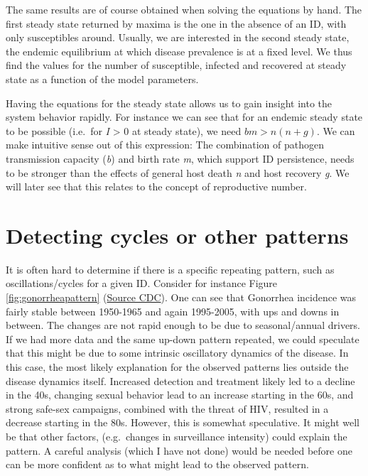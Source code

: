 \documentclass[
]{book}
\begin{document}
The same results are of course obtained when solving the equations by hand. The first steady state returned by maxima is the one in the absence of an ID, with only susceptibles around. Usually, we are interested in the second steady state, the endemic equilibrium at which disease prevalence is at a fixed level. We thus find the values for the number of susceptible, infected and recovered at steady state as a function of the model parameters.

Having the equations for the steady state allows us to gain insight into the system behavior rapidly. For instance we can see that for an endemic steady state to be possible (i.e.~for \emph{I} \textgreater{} 0 at steady state), we need \(b m > n (n+ g)\). We can make intuitive sense out of this expression: The combination of pathogen transmission capacity (\emph{b}) and birth rate \emph{m}, which support ID persistence, needs to be stronger than the effects of general host death \emph{n} and host recovery \emph{g}. We will later see that this relates to the concept of reproductive number.

\hypertarget{detecting-cycles-or-other-patterns}{%
\section{Detecting cycles or other patterns}\label{detecting-cycles-or-other-patterns}}

It is often hard to determine if there is a specific repeating pattern, such as oscillations/cycles for a given ID. Consider for instance Figure \ref{fig:gonorrheapattern} (\href{http://www.cdc.gov/STD/stats06/images/trends-img-2.gif}{Source CDC}).
One can see that Gonorrhea incidence was fairly stable between 1950-1965 and again 1995-2005, with ups and downs in between. The changes are not rapid enough to be due to seasonal/annual drivers. If we had more data and the same up-down pattern repeated, we could speculate that this might be due to some intrinsic oscillatory dynamics of the disease. In this case, the most likely explanation for the observed patterns lies outside the disease dynamics itself. Increased detection and treatment likely led to a decline in the 40s, changing sexual behavior lead to an increase starting in the 60s, and strong safe-sex campaigns, combined with the threat of HIV, resulted in a decrease starting in the 80s. However, this is somewhat speculative. It might well be that other factors, (e.g.~changes in surveillance intensity) could explain the pattern. A careful analysis (which I have not done) would be needed before one can be more confident as to what might lead to the observed pattern.
\end{document}
